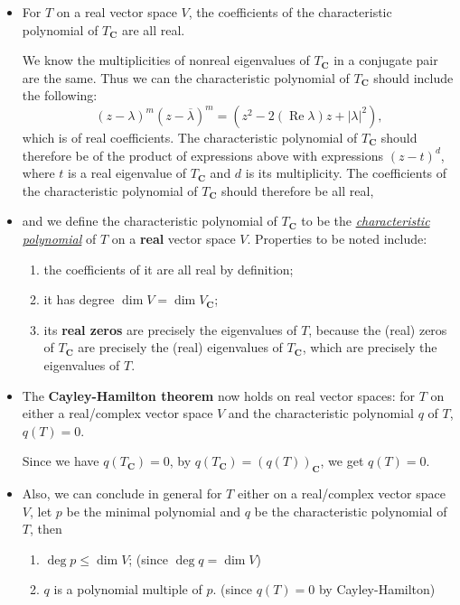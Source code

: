 \documentclass[11pt]{article}
\newcommand{\df}[1]{\ul{\textit{\textsf{#1}}}}
\newcommand{\C}{\mathbf{C}}
\renewcommand{\Re}{\operatorname{Re}}
\renewcommand{\d}{\dim}
\newcommand{\conj}[1]{\overline{#1}}
\newcommand{\abs}[1]{\lvert #1 \rvert}
\begin{document}
\begin{itemize}
    \item For $T$ on a real vector space $V$, the coefficients of the characteristic polynomial of $T_\C$ are all real.

    We know the multiplicities of nonreal eigenvalues of $T_\C$ in a conjugate pair are the same. Thus we can the characteristic polynomial of $T_\C$ should include the following: \[(z-\lambda)^m(z-\conj{\lambda})^m = (z^2 - 2(\Re \lambda)z + \abs{\lambda}^2),\] which is of real coefficients. The characteristic polynomial of $T_\C$ should therefore be of the product of expressions above with expressions $(z-t)^d$, where $t$ is a real eigenvalue of $T_\C$ and $d$ is its multiplicity. The coefficients of the characteristic polynomial of $T_\C$ should therefore be all real,
    \item and we define the characteristic polynomial of $T_\C$ to be the \df{characteristic polynomial} of $T$ on a \textbf{real} vector space $V$. Properties to be noted include:
    \begin{enumerate}[label=(\alph*)]
        \item the coefficients of it are all real by definition;
        \item it has degree $\d V = \d V_\C$;
        \item its \textbf{real zeros} are precisely the eigenvalues of $T$, because the (real) zeros of $T_\C$ are precisely the (real) eigenvalues of $T_\C$, which are precisely the eigenvalues of $T$.
    \end{enumerate}
    \item The \textbf{Cayley-Hamilton theorem} now holds on real vector spaces: for $T$ on either a real/complex vector space $V$ and the characteristic polynomial $q$ of $T$, $q(T) = 0$.
    
    Since we have $q(T_\C) = 0$, by $q(T_\C) = (q(T))_\C$, we get $q(T) = 0$.
    \item Also, we can conclude in general for $T$ either on a real/complex vector space $V$, let $p$ be the minimal polynomial and $q$ be the characteristic polynomial of $T$, then
    \begin{enumerate}[label=(\alph*)]
        \item $\deg p \leq \d V$; (since $\deg q = \d V$)
        \item $q$ is a polynomial multiple of $p$. (since $q(T) = 0$ by Cayley-Hamilton)
    \end{enumerate}
\end{itemize}
\end{document}
